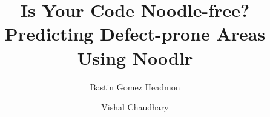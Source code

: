 \documentclass{sig-alternate}
\begin{document}
\date{}

\title{Is Your Code Noodle-free? \\
Predicting Defect-prone Areas Using Noodlr}

\author{Bastin Gomez Headmon}
\author{Vishal Chaudhary}

\maketitle

\thispagestyle{empty}














%

%

 

%	
\end{document}
